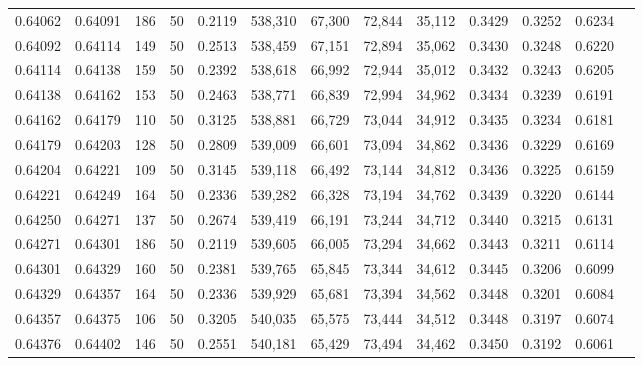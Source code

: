 \begin{tabular}{rrrrrrrrrrrrr}
0.64062 & 0.64091 &   186 &  50 &                                     0.2119 & 538,310 &  67,300 &  72,844 &  35,112 & 0.3429 & 0.3252 & 0.6234 \\
0.64092 & 0.64114 &   149 &  50 &                                     0.2513 & 538,459 &  67,151 &  72,894 &  35,062 & 0.3430 & 0.3248 & 0.6220 \\
0.64114 & 0.64138 &   159 &  50 &                                     0.2392 & 538,618 &  66,992 &  72,944 &  35,012 & 0.3432 & 0.3243 & 0.6205 \\
0.64138 & 0.64162 &   153 &  50 &                                     0.2463 & 538,771 &  66,839 &  72,994 &  34,962 & 0.3434 & 0.3239 & 0.6191 \\
0.64162 & 0.64179 &   110 &  50 &                                     0.3125 & 538,881 &  66,729 &  73,044 &  34,912 & 0.3435 & 0.3234 & 0.6181 \\
0.64179 & 0.64203 &   128 &  50 &                                     0.2809 & 539,009 &  66,601 &  73,094 &  34,862 & 0.3436 & 0.3229 & 0.6169 \\
0.64204 & 0.64221 &   109 &  50 &                                     0.3145 & 539,118 &  66,492 &  73,144 &  34,812 & 0.3436 & 0.3225 & 0.6159 \\
0.64221 & 0.64249 &   164 &  50 &                                     0.2336 & 539,282 &  66,328 &  73,194 &  34,762 & 0.3439 & 0.3220 & 0.6144 \\
0.64250 & 0.64271 &   137 &  50 &                                     0.2674 & 539,419 &  66,191 &  73,244 &  34,712 & 0.3440 & 0.3215 & 0.6131 \\
0.64271 & 0.64301 &   186 &  50 &                                     0.2119 & 539,605 &  66,005 &  73,294 &  34,662 & 0.3443 & 0.3211 & 0.6114 \\
0.64301 & 0.64329 &   160 &  50 &                                     0.2381 & 539,765 &  65,845 &  73,344 &  34,612 & 0.3445 & 0.3206 & 0.6099 \\
0.64329 & 0.64357 &   164 &  50 &                                     0.2336 & 539,929 &  65,681 &  73,394 &  34,562 & 0.3448 & 0.3201 & 0.6084 \\
0.64357 & 0.64375 &   106 &  50 &                                     0.3205 & 540,035 &  65,575 &  73,444 &  34,512 & 0.3448 & 0.3197 & 0.6074 \\
0.64376 & 0.64402 &   146 &  50 &                                     0.2551 & 540,181 &  65,429 &  73,494 &  34,462 & 0.3450 & 0.3192 & 0.6061 \\

\end{tabular}
